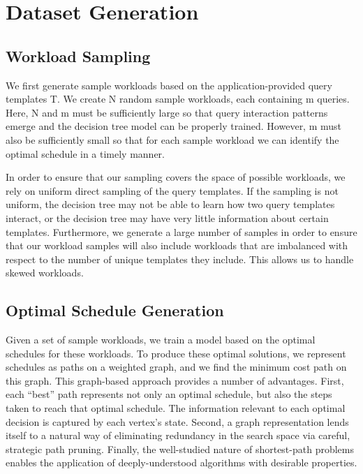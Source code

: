 \chapter{Dataset Generation}
\section{Workload Sampling}
We first generate sample workloads based on the application-provided query templates T. We create N random sample workloads, each containing m queries. Here, N and m must be sufficiently large so that query interaction patterns emerge and the decision tree model can be properly trained. However, m must also be sufficiently small so that for each sample workload we can identify the optimal schedule in a timely manner. 

In order to ensure that our sampling covers the space of possible workloads, we rely on uniform direct sampling of the query templates. If the sampling is not uniform, the decision tree may not be able to learn how two query templates interact, or the decision tree may have very little information about certain templates. Furthermore, we generate a large number of samples in order to ensure that our workload samples will also include workloads that are imbalanced with respect to the number of unique templates they include. This allows us to handle skewed workloads.

\section{Optimal Schedule Generation}
Given a set of sample workloads, we train a model based on the optimal schedules for these workloads. To produce these optimal solutions, we represent schedules as paths on a weighted graph, and we find the minimum cost path on this graph. This graph-based approach\cite{marcus2016wisedb} provides a number of advantages. First, each “best” path represents not only an optimal schedule, but also the steps taken to reach that optimal schedule. The information relevant to each optimal decision is captured by each vertex’s state. Second, a graph representation lends itself to a natural way of eliminating redundancy in the search space via careful, strategic path pruning. Finally, the well-studied nature of shortest-path problems enables the application of deeply-understood algorithms with desirable properties.
